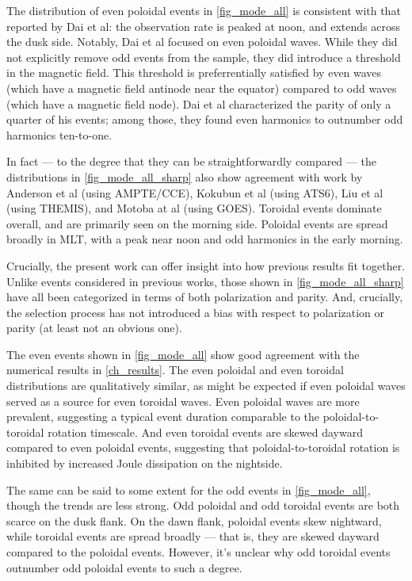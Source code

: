 The distribution of even poloidal events in \cref{fig_mode_all} is
consistent with that reported by Dai et al\cite{dai_2015}: the observation rate
is peaked at noon, and extends across the dusk side. Notably, Dai et al focused
on even poloidal waves. While they did not explicitly remove odd events from
the sample, they did introduce a threshold in the magnetic field. This
threshold is
preferrentially satisfied by even waves (which have a magnetic field antinode
near the equator) compared to odd waves (which have a magnetic field node). 
Dai et al
characterized the parity of only a quarter of his events; among those, they
found even harmonics to outnumber odd harmonics ten-to-one. 

In fact --- to the degree that they can be straightforwardly compared --- the
distributions in \cref{fig_mode_all_sharp} also show agreement with work by
Anderson et al\cite{anderson_1990} (using AMPTE/CCE), Kokubun et 
al\cite{kokubun_1989}
(using ATS6), Liu et al\cite{liu_2009} (using THEMIS), and Motoba at 
al\cite{motoba_2015}
(using GOES). Toroidal events dominate overall, and are primarily seen on the
morning side. Poloidal events are spread broadly in MLT, with a peak near noon
and odd harmonics in the early morning. 

Crucially, the present work can offer insight into how previous results fit
together. Unlike events considered in previous works, those shown in
\cref{fig_mode_all_sharp} have all been categorized in terms of both
polarization and parity. And, crucially, the selection process has not
introduced a bias with respect to polarization or parity (at least not an
obvious one). 

The even events shown in \cref{fig_mode_all} show good agreement with the
numerical results in \cref{ch_results}. The even poloidal and even toroidal
distributions are qualitatively similar, as might be expected if even poloidal
waves served as a source for even toroidal waves. Even poloidal waves are more
prevalent, suggesting a typical event duration comparable to the
poloidal-to-toroidal rotation timescale. And even toroidal events are skewed
dayward compared to even poloidal events, suggesting that poloidal-to-toroidal
rotation is inhibited by increased Joule dissipation on the nightside. 

The same can be said to some extent for the odd events in
\cref{fig_mode_all}, though the trends are less strong. Odd poloidal and
odd toroidal events are both scarce on the dusk flank. On the dawn flank,
poloidal events skew nightward, while toroidal events are spread broadly ---
that is, they are skewed dayward compared to the poloidal events. However, it's
unclear why odd toroidal events outnumber odd poloidal events to such a degree. 

